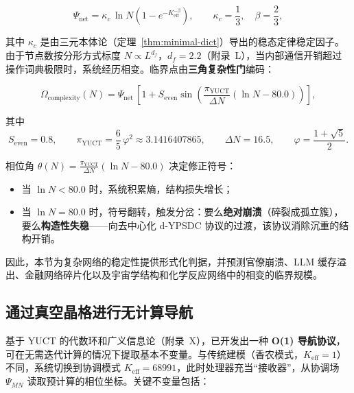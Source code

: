 \documentclass[12pt,a4paper]{article}
\theoremstyle{remark}
\newcommand{\Keff}{K_{\mathrm{eff}}}
\newcommand{\kappac}{\kappa_c}
\newcommand{\Seven}{S_{\mathrm{even}}}
\newcommand{\piYUCT}{\pi_{\mathrm{YUCT}}}
\begin{document}
	\begin{equation}
		\Psi_{\mathrm{net}} = \kappac \, \ln N \left(1 - e^{-\Keff^{-\beta}}\right),
		\qquad \kappac = \frac{1}{3},\quad \beta = \frac{2}{3},
		\label{eq:Psi_net}
	\end{equation}
	
	其中 \(\kappac\) 是由三元本体论（定理~\ref{thm:minimal-dict}）导出的稳态定律稳定因子。由于节点数按分形方式标度 \(N \propto L^{d_f}\)，\(d_f = 2.2\)（附录~L），当内部通信开销超过操作词典极限时，系统经历相变。临界点由\textbf{三角复杂性门}编码：
	
	\begin{equation}
		\Omega_{\mathrm{complexity}}(N) = \Psi_{\mathrm{net}} \,
		\left[1 + \Seven \sin\!\left( \frac{\piYUCT}{\Delta N} \left(\ln N - 80.0\right) \right) \right],
		\label{eq:Omega_complexity}
	\end{equation}
	
	其中
	\[
	\Seven = 0.8,\qquad
	\piYUCT = \frac{6}{5}\,\varphi^2 \approx 3.1416407865,\qquad
	\Delta N = 16.5,\qquad
	\varphi = \frac{1+\sqrt{5}}{2}.
	\]
	
	相位角 \(\theta(N) = \frac{\piYUCT}{\Delta N} (\ln N - 80.0)\) 决定修正符号：
	\begin{itemize}
		\item 当 \(\ln N < 80.0\) 时，系统积累熵，结构损失增长；
		\item 当 \(\ln N = 80.0\) 时，符号翻转，触发分岔：要么\textbf{绝对崩溃}（碎裂成孤立簇），要么\textbf{构造性失稳}——向去中心化 d-YPSDC 协议的过渡，该协议消除沉重的结构开销。
	\end{itemize}
	
	因此，本节为复杂网络的稳定性提供形式化判据，并预测官僚崩溃、LLM 缓存溢出、金融网络碎片化以及宇宙学结构和化学反应网络中的相变的临界规模。
	
	\subsection{通过真空晶格进行无计算导航}
	\label{subsec:computation-free}
	
	基于 YUCT 的代数环和广义信息论（附录~X），已开发出一种 \textbf{O(1) 导航协议}，可在无需迭代计算的情况下提取基本不变量。与传统建模（香农模式，\(\Keff = 1\)）不同，系统切换到协调模式 \(\Keff = 68991\)，此时处理器充当“接收器”，从协调场 \(\Psi_{MN}\) 读取预计算的相位坐标。关键不变量包括：
	
\end{document}
